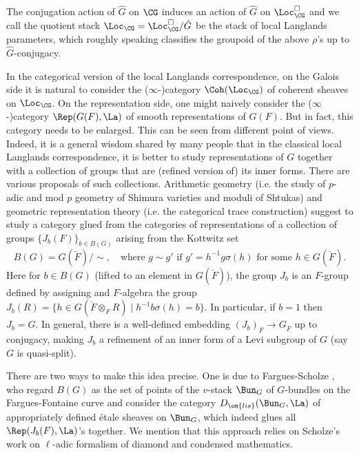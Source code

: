 \documentclass[11pt]{amsart}
\theoremstyle{definition}
\theoremstyle{definition}
\theoremstyle{definition}
\numberwithin{equation}{section}
\begin{document}
The conjugation action of $\hat{G}$ on $\CG$ induces an action of $\hat{G}$ on $\Loc_{\CG}^\Box$ and we call the quotient stack $\Loc_{\CG}=\Loc_{\CG}^\Box/\hat{G}$ be the stack of local Langlands parameters, which roughly speaking classifies the groupoid of the above $\rho$'s up to $\hat{G}$-conjugacy. 

In the categorical version of the local Langlands correspondence,
on the Galois side it is natural to consider the ($\infty$-)category $\Coh(\Loc_{\CG})$ of coherent sheaves on $\Loc_{\CG}$.
On the representation side, one might naively consider the ($\infty$-)category $\Rep(G(F),\La)$ of smooth representations of $G(F)$.
But in fact, this category needs to be enlarged.
This can be seen from different point of views. Indeed, it is a general wisdom shared by many people that in the classical local Langlands correspondence, it is better to study representations of $G$ together with a collection of groups that are (refined version of) its inner forms. There are various proposals of such collections.
Arithmetic geometry (i.e. the study of $p$-adic and mod $p$ geometry of Shimura varieties and moduli of Shtukas) and geometric representation theory (i.e. the categorical trace construction) suggest  to study a category glued from the categories of representations of  a collection of groups $\{J_b(F)\}_{b\in B(G)}$ arising from the Kottwitz set 
\[
B(G) = G(\breve F)/\sim, \quad \mbox{where } g\sim g' \mbox{ if } g'=h^{-1}g\sigma(h) \mbox{ for some }  h\in G(\breve F).
\] 
Here for $b\in B(G)$ (lifted to an element in $G(\breve F)$), the group $J_b$  is an $F$-group defined by assigning and $F$-algebra the group $J_b(R)=\{h\in G(\breve F\otimes_FR)\mid h^{-1}b\sigma(h)=b\}$. In particular, if $b=1$ then $J_b=G$. In general, there is a well-defined embedding $(J_{b})_{\overline{F}}\to G_{\overline{F}}$ up to conjugacy, making $J_b$ a refinement of an inner form of a Levi subgroup of $G$ (say $G$ is quasi-split).

There are two ways to make this idea precise.
One is due to Fargues-Scholze \cite{Fargues-Scholze-Geometrization}, who regard $B(G)$ as the set of points of the $v$-stack $\Bun_G$ of $G$-bundles on the Fargues-Fontaine curve and consider the category $D_{\on{lis}}(\Bun_G,\La)$ of appropriately defined \'etale sheaves on $\Bun_G$, which indeed glues all $\Rep(J_b(F),\La)$'s together. We mention that this approach relies on Scholze's work on $\ell$-adic formalism of diamond and condensed mathematics. 
\end{document}
